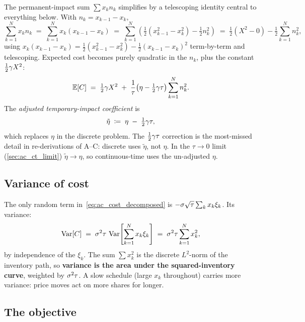 The permanent-impact sum $\sum x_k n_k$ simplifies by a
telescoping identity central to everything below. With
$n_k = x_{k-1} - x_k$,
\begin{equation}
  \sum_{k=1}^N x_k n_k
    \;=\; \sum_{k=1}^N x_k(x_{k-1} - x_k)
    \;=\; \sum_{k=1}^N \left(\tfrac{1}{2}(x_{k-1}^2 - x_k^2) - \tfrac{1}{2}n_k^2\right)
    \;=\; \tfrac{1}{2}(X^2 - 0) - \tfrac{1}{2}\sum_{k=1}^N n_k^2,
  \label{eq:ac_telescope}
\end{equation}
using $x_k(x_{k-1}-x_k) = \tfrac{1}{2}(x_{k-1}^2 - x_k^2) -
\tfrac{1}{2}(x_{k-1}-x_k)^2$ term-by-term and telescoping. Expected
cost becomes purely quadratic in the $n_k$, plus the constant
$\tfrac{1}{2}\gamma X^2$:
\begin{equation}
  \mathbb{E}[C] \;=\; \tfrac{1}{2}\gamma X^2
            \;+\; \frac{1}{\tau}\bigl(\eta - \tfrac{1}{2}\gamma\tau\bigr)
                    \sum_{k=1}^N n_k^2.
  \label{eq:ac_EC_clean}
\end{equation}
The \emph{adjusted temporary-impact coefficient} is
\begin{equation}
  \tilde\eta \;\coloneqq\; \eta \;-\; \tfrac{1}{2}\gamma\tau,
  \label{eq:ac_etatilde}
\end{equation}
which replaces $\eta$ in the discrete problem. The
$\tfrac{1}{2}\gamma\tau$ correction is the most-missed detail in
re-derivations of A--C: discrete uses $\tilde\eta$, not $\eta$. In
the $\tau \to 0$ limit (\cref{sec:ac_ct_limit}) $\tilde\eta \to
\eta$, so continuous-time uses the un-adjusted $\eta$.

\subsection{Variance of cost}
\label{subsec:ac_variance}

The only random term in~\eqref{eq:ac_cost_decomposed} is
$-\sigma\sqrt\tau\sum_k x_k \xi_k$. Its variance:
\begin{equation}
  \operatorname{Var}[C]
  \;=\; \sigma^2\tau\,\operatorname{Var}\!\left[\sum_{k=1}^N x_k\xi_k\right]
  \;=\; \sigma^2\tau \sum_{k=1}^N x_k^2,
  \label{eq:ac_var}
\end{equation}
by independence of the $\xi_k$. The sum $\sum x_k^2$ is the
discrete $L^2$-norm of the inventory path, so \textbf{variance is
the area under the squared-inventory curve}, weighted by
$\sigma^2\tau$. A slow schedule (large $x_k$ throughout) carries
more variance: price moves act on more shares for longer.

\subsection{The objective}
\label{subsec:ac_obj}

